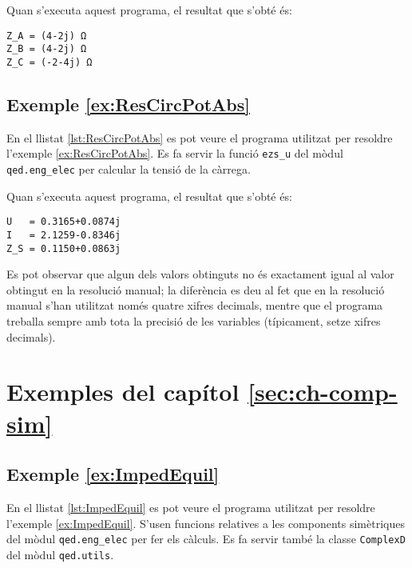 Quan s'executa aquest programa, el resultat que s'obté és:
\lstset{
	language=,
	numbers=none,
	frame=none
}
\begin{lstlisting}
Z_A = (4-2j) Ω
Z_B = (4-2j) Ω
Z_C = (-2-4j) Ω
\end{lstlisting}


\hypertarget{exemple:ResCircPotAbs}{\subsection{Exemple \ref*{ex:ResCircPotAbs} \ResCircPotAbs}}
En el llistat \vref{lst:ResCircPotAbs} es pot veure el programa utilitzat per resoldre l'exemple \vref{ex:ResCircPotAbs}. Es fa servir la funció \texttt{ezs\_u} del mòdul \texttt{qed.eng\_elec} per calcular la tensió de la càrrega.


Quan s'executa aquest programa, el resultat que s'obté és:
\lstset{
	language=,
	numbers=none,
	frame=none
}
\begin{lstlisting}
U   = 0.3165+0.0874j
I   = 2.1259-0.8346j
Z_S = 0.1150+0.0863j
\end{lstlisting}

Es pot observar que algun dels valors obtinguts no és exactament igual al valor obtingut en la resolució manual; la diferència es deu al fet que en la resolució manual s'han utilitzat només quatre xifres decimals, mentre que el programa treballa sempre amb tota la precisió de les variables (típicament, setze xifres decimals).



\section{Exemples del capítol \ref*{sec:ch-comp-sim}}

\hypertarget{exemple:ImpedEquil}{\subsection{Exemple \ref*{ex:ImpedEquil} \ImpedEquil}}
En el llistat \vref{lst:ImpedEquil} es pot veure el programa utilitzat per resoldre l'exemple \vref{ex:ImpedEquil}. S'usen funcions relatives a les components simètriques del mòdul \texttt{qed.eng\_elec} per fer els càlculs. Es fa servir també la classe \texttt{ComplexD} del mòdul \texttt{qed.utils}.



